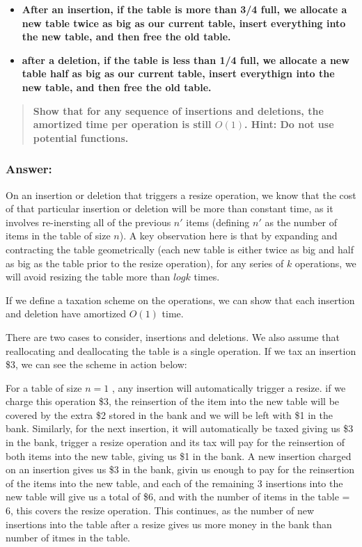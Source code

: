 \documentclass[titlepage]{article}\usepackage[]{graphicx}\usepackage[]{color}
\begin{document}
\begin{itemize}
	\item \textbf{After an insertion, if the table is more than 3/4 full, we
			allocate a new table twice as big as our current table, insert
		everything into the new table, and then free the old table.}
	\item \textbf{ after a deletion, if the table is less than 1/4 full, we
			allocate a new table half as big as our current table, insert
		everythign into the new table, and then free the old table.}
\end{itemize}
\begin{quote}
	\textbf{Show that for any sequence of insertions and deletions, the
		amortized time per operation is still $O(1)$. Hint: Do not use
	potential functions.}
\end{quote}

\subsubsection{Answer:}
On an insertion or deletion that triggers a resize operation, we know that the
cost of that particular insertion or deletion will be more than constant time,
as it involves re-inersting all of the previous $n'$ items (defining $n'$ as
the number of items in the table of size $n$). A key observation here is that
by expanding and contracting the table geometrically (each new table is either 
twice as big and half as big as the table prior to the resize operation), for
any series of $k$ operations, we will avoid resizing the table more than $log k$ 
times. 

If we define a taxation scheme on the operations, we can show that each
insertion and deletion have amortized $O(1)$ time. 

There are two cases to consider, insertions and deletions. We also assume that
reallocating and deallocating the table is a single operation. If we tax an
insertion \$3, we can see the scheme in action below:

For a table of size $n=1$ , any insertion will automatically trigger a resize.
if we charge this operation \$3, the reinsertion of the item into the new table
will be covered by the extra \$2 stored in the bank and we will be left with 
\$1 in the bank. Similarly, for the next insertion, it will automatically
be taxed giving us \$3 in the bank, trigger a resize operation and its tax will
pay for the reinsertion of both items into the new table, giving us \$1 in the
bank. A new insertion charged on an insertion gives us \$3 in the bank, givin
us enough to pay for the reinsertion of the items into the new table, and each
of the remaining 3 insertions into the new table will give us a total of \$6,
and with the number of items in the table = 6, this covers the resize
operation. This continues, as the number of new insertions into the table after
a resize gives us more money in the bank than number of itmes in the table. 
\end{document}
